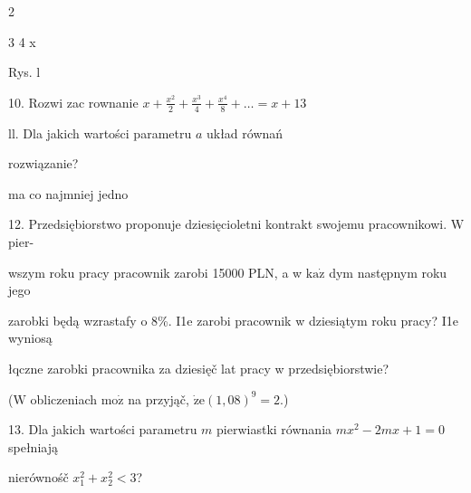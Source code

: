 \documentclass[a4paper,12pt]{article}
\begin{document}
2

3 4 x

Rys. l

10. Rozwi zac rownanie $x+\displaystyle \frac{x^{2}}{2}+\frac{x^{3}}{4}+\frac{x^{4}}{8}+\ldots=x+13$

ll. Dla jakich wartości parametru $a$ układ równań 

rozwiązanie?

ma co najmniej jedno

12. Przedsiębiorstwo proponuje dziesięcioletni kontrakt swojemu pracownikowi. $\mathrm{W}$ pier-

wszym roku pracy pracownik zarobi 15000 PLN, a w $\mathrm{k}\mathrm{a}\dot{\mathrm{z}}$ dym następnym roku jego

zarobki będą wzrastafy o 8\%. I1e zarobi pracownik w dziesiątym roku pracy? I1e wyniosą

łqczne zarobki pracownika za dziesięč lat pracy w przedsiębiorstwie?

($\mathrm{W}$ obliczeniach $\mathrm{m}\mathrm{o}\dot{\mathrm{z}}$ na przyjąč, $\dot{\mathrm{z}}\mathrm{e}(1,08)^{9}=2.$)

13. Dla jakich wartości parametru $m$ pierwiastki równania $mx^{2}-2mx+1=0$ spełniają

nierównośč $x_{1}^{2}+x_{2}^{2}<3$?
\end{document}

